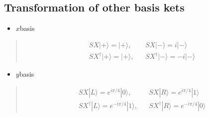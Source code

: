 \documentclass[letterpaper,10pt,english]{jupyterBook}
\begin{document}
\subsection{Transformation of other basis kets}
\label{\detokenize{q1gates/sx:transformation-of-other-basis-kets}}\begin{itemize}
\item {}
\sphinxAtStartPar
\(x\)\sphinxhyphen{}basis

\end{itemize}
\begin{quote}
\begin{align}
&SX |+\rangle = |+\rangle,  &&SX |-\rangle = i |-\rangle \\
&SX^\dagger |+\rangle = |+\rangle, &&SX^\dagger |-\rangle = -i |-\rangle
\end{align}
\end{quote}
\begin{itemize}
\item {}
\sphinxAtStartPar
\(y\)\sphinxhyphen{}basis

\end{itemize}
\begin{quote}
\begin{align}
&SX |L\rangle = e^{i\pi/4}|0\rangle,  &&SX |R\rangle = e^{i\pi/4}|1\rangle\\
&SX^\dagger |L\rangle = e^{-i\pi/4}|1\rangle, &&SX^\dagger |R\rangle = e^{-i\pi/4}|0\rangle
\end{align}
\end{quote}
\end{document}
